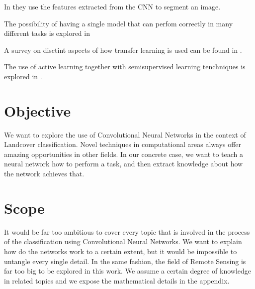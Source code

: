 In \cite{DBLP:journals/corr/LongSD14} they use the features extracted from the CNN to segment an image.

The possibility of having a single model that can perfom correctly in many different tasks is explored in \cite{DBLP:journals/corr/KaiserGSVPJU17}

A survey on disctint aspects of how transfer learning is used can be found in \cite{5288526}.

The use of active learning together with semisupervised learning tenchniques is explored in \cite{7956153}.


\section{Objective}

We want to explore the use of Convolutional Neural Networks in the context of Landcover classification. Novel techniques in computational areas always offer amazing opportunities in other fields. In our concrete case, we want to teach a neural network how to perform a task, and then extract knowledge about how the network achieves that.\\

\section{Scope}

It would be far too ambitious to cover every topic that is involved in the process of the classification using Convolutional Neural Networks. We want to explain how do the networks work to a certain extent, but it would be impossible to untangle every single detail. In the same fashion, the field of Remote Sensing is far too big to be explored in this work. We assume a certain degree of knowledge in related topics and we expose the mathematical details in the appendix.\\
